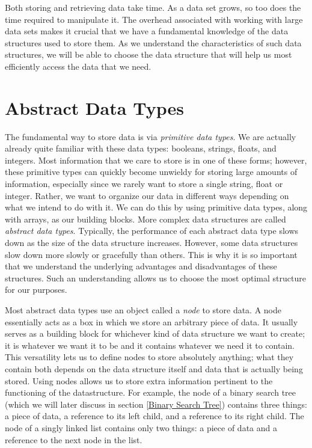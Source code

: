 \label{lab:Python_DataStructures}

Both storing and retrieving data take time. As a data set grows, so too does the time required to manipulate it.
The overhead associated with working with large data sets makes it crucial that we have a fundamental knowledge of the data structures used to store them.
As we understand the characteristics of such data structures, we will be able to choose the data structure that will help us most efficiently access the data that we need.

\section*{Abstract Data Types}
The fundamental way to store data is via \emph{primitive data types}.
We are actually already quite familiar with these data types: booleans, strings, floats, and integers.
Most information that we care to store is in one of these forms; however, these primitive types can quickly become unwieldy for storing large amounts of information, especially since we rarely want to store a single string, float or integer. Rather, we want to organize our data in different ways depending on what we intend to do with it.
We can do this by using primitive data types, along with arrays, as our building blocks.
More complex data structures are called \emph{abstract data types}.
Typically, the performance of each abstract data type slows down as the size of the data structure increases.
However, some data structures slow down more slowly or gracefully than others.
This is why it is so important that we understand the underlying advantages and disadvantages of these structures.
Such an understanding allows us to choose the most optimal structure for our purposes.

Most abstract data types use an object called a \emph{node} to store data.
A node essentially acts as a box in which we store an arbitrary piece of data.
It usually serves as a building block for whichever kind of data structure we want to create; it is whatever we want it to be and it contains whatever we need it to contain.
This versatility lets us to define nodes to store absolutely anything; what they contain both depends on the data structure itself and data that is actually being stored.
Using nodes allows us to store extra information pertinent to the functioning of the datastructure.
For example, the node of a binary search tree (which we will later discuss in section \ref{Binary Search Tree}) contains three things: a piece of data, a reference to its left child, and a reference to its right child.
The node of a singly linked list contains only two things: a piece of data and a reference to the next node in the list.

